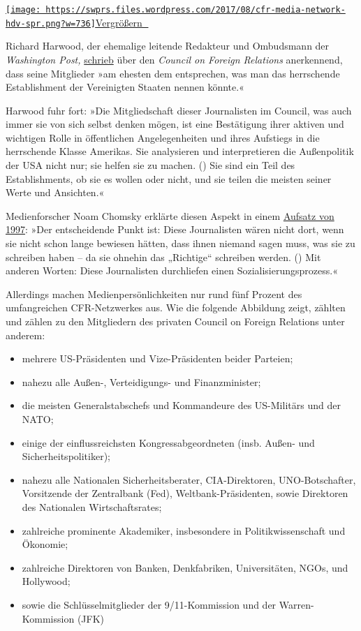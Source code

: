 \href{https://swprs.files.wordpress.com/2017/08/cfr-media-network-hdv-spr.png}{\texttt{[image: https://swprs.files.wordpress.com/2017/08/cfr-media-network-hdv-spr.png?w=736]}}\href{https://swprs.files.wordpress.com/2017/08/cfr-media-network-hdv-spr.png}{Vergrößern
🔎}

Richard Harwood, der ehemalige leitende Redakteur und Ombudsmann der
\emph{Washington Post,}
\href{https://www.washingtonpost.com/archive/opinions/1993/10/30/ruling-class-journalists/761e7bf8-025d-474e-81cb-92dcf271571e/}{schrieb}
über den \emph{Council on Foreign Relations} anerkennend, dass seine
Mitglieder »am ehesten dem entsprechen, was man das herrschende
Establishment der Vereinigten Staaten nennen könnte.«

Harwood fuhr fort: »Die Mitgliedschaft dieser Journalisten im Council,
was auch immer sie von sich selbst denken mögen, ist eine Bestätigung
ihrer aktiven und wichtigen Rolle in öffentlichen Angelegenheiten und
ihres Aufstiegs in die herrschende Klasse Amerikas. Sie analysieren und
interpretieren die Außenpolitik der USA nicht nur; sie helfen sie zu
machen. () Sie sind ein Teil des Establishments, ob sie es wollen oder
nicht, und sie teilen die meisten seiner Werte und Ansichten.«

Medienforscher Noam Chomsky erklärte diesen Aspekt in einem
\href{https://chomsky.info/199710__/}{Aufsatz von 1997}: »Der
entscheidende Punkt ist: Diese Journalisten wären nicht dort, wenn sie
nicht schon lange bewiesen hätten, dass ihnen niemand sagen muss, was
sie zu schreiben haben -- da sie ohnehin das „Richtige`` schreiben
werden. () Mit anderen Worten: Diese Journalisten durchliefen einen
Sozialisierungsprozess.«

Allerdings machen Medienpersönlichkeiten nur rund fünf Prozent des
umfangreichen CFR-Netzwerkes aus. Wie die folgende Abbildung zeigt,
zählten und zählen zu den Mitgliedern des privaten Council on Foreign
Relations unter anderem:

\begin{itemize}
\tightlist
\item
  mehrere US-Präsidenten und Vize-Präsidenten beider Parteien;
\item
  nahezu alle Außen-, Verteidigungs- und Finanzminister;
\item
  die meisten Generalstabschefs und Kommandeure des US-Militärs und der
  NATO;
\item
  einige der einflussreichsten Kongressabgeordneten (insb. Außen- und
  Sicherheitspolitiker);
\item
  nahezu alle Nationalen Sicherheitsberater, CIA-Direktoren,
  UNO-Botschafter, Vorsitzende der Zentralbank (Fed),
  Weltbank-Präsidenten, sowie Direktoren des Nationalen
  Wirtschaftsrates;
\item
  zahlreiche prominente Akademiker, insbesondere in Politikwissenschaft
  und Ökonomie;
\item
  zahlreiche Direktoren von Banken, Denkfabriken, Universitäten, NGOs,
  und Hollywood;
\item
  sowie die Schlüsselmitglieder der 9/11-Kommission und der
  Warren-Kommission (JFK)
\end{itemize}

